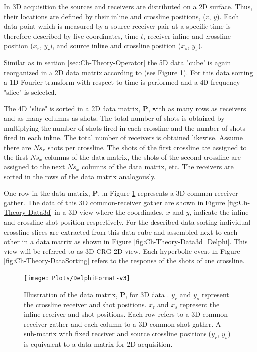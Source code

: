 In 3D acquisition the sources and receivers are distributed on a 2D surface. Thus, their locations are defined by their inline and crossline positions, ($x$, $y$). Each data point which is measured by a source receiver pair at a specific time is therefore described by five coordinates, time $t$, receiver inline and crossline position ($x_r$, $y_r$), and source inline and crossline position ($x_s$, $y_s$).

Similar as in section \ref{sec:Ch-Theory-Operator} the 5D data "cube" is again reorganized in a 2D data matrix according to \citet{Delphi-Format} (see Figure \ref{fig:Ch-Theory-DelphiFormat}). For this data sorting a 1D Fourier transform with respect to time is performed and a 4D frequency "slice" is selected.

The 4D "slice" is sorted in a 2D data matrix, $\mathbf{P}$, with as many rows as receivers and as many columns as shots. The total number of shots is obtained by multiplying the number of shots fired in each crossline and the number of shots fired in each inline. The total number of receivers is obtained likewise. Assume there are $Ns_x$ shots per crossline. The shots of the first crossline are assigned to the first $Ns_x$ columns of the data matrix, the shots of the second crossline are assigned to the next $Ns_x$ columns of the data matrix, etc. The receivers are sorted in the rows of the data matrix analogously.


One row in the data matrix, $\mathbf{P}$, in Figure \ref{fig:Ch-Theory-DelphiFormat} represents  a 3D common-receiver gather. The data of this 3D common-receiver gather are shown in Figure \ref{fig:Ch-Theory-Data3d} in a 3D-view where the coordinates, $x$ and $y$, indicate the inline and crossline shot position respectively. For the described data sorting individual crossline slices are extracted from this data cube and assembled next to each other in a data matrix as shown in Figure \ref{fig:Ch-Theory-Data3d_Delphi}. This view will be referred to as 3D CRG 2D view. Each hyperbolic event in Figure \ref{fig:Ch-Theory-DataSorting} refers to the response of the shots of one crossline.

\begin{figure}
	\centering
	\texttt{[image: Plots/DelphiFormat-v3]}
	\caption{Illustration of the data matrix, $\mathbf{P}$, for 3D data \citep{Delphi-Format}. $y_r$ and $y_s$ represent the crossline receiver and shot positions. $x_r$ and $x_s$ represent the inline receiver and shot positions. Each row refers to a 3D common-receiver gather and each column to a 3D common-shot gather. A sub-matrix with fixed receiver and source crossline positions ($y_r$, $y_s$) is equivalent to a data matrix for 2D acquisition.}
	\label{fig:Ch-Theory-DelphiFormat}
\end{figure}


